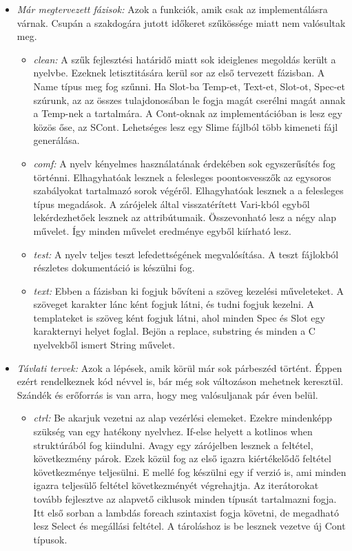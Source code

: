 {\begin{itemize}
\item \emph{Már megtervezett fázisok:}
Azok a funkciók, amik csak az implementálásra várnak.
Csupán a szakdogára jutott időkeret szűkössége miatt nem valósultak meg.
\begin{itemize}
\item \emph{clean:}
A szűk fejlesztési határidő miatt sok ideiglenes megoldás került a nyelvbe.
Ezeknek letisztitására kerül sor az első tervezett fázisban.
A Name típus meg fog szűnni.
Ha Slot-ba Temp-et, Text-et, Slot-ot, Spec-et szúrunk, az az összes tulajdonosában le fogja magát cserélni magát annak a Temp-nek a tartalmára.
A Cont-oknak az implementációban is lesz egy közös őse, az SCont.
Lehetséges lesz egy Slime fájlból több kimeneti fájl generálása.
\item \emph{comf:}
A nyelv kényelmes használatának érdekében sok egyszerűsítés fog történni.
Elhagyhatóak lesznek a felesleges poontosvesszők az egysoros szabályokat tartalmazó sorok végéről.
Elhagyhatóak lesznek a a felesleges típus megadások.
A zárójelek által visszatérített Vari-kból egyből lekérdezhetőek lesznek az attribútumaik. 
Összevonható lesz a négy alap művelet.
Így minden művelet eredménye egyből kiírható lesz.
\item \emph{test:}
A nyelv teljes teszt lefedettségének megvalósítása.
A teszt fájlokból részletes dokumentáció is készülni fog.
\item \emph{text:}
Ebben a fázisban ki fogjuk bővíteni a szöveg kezelési műveleteket.
A szöveget karakter lánc ként fogjuk látni, és tudni fogjuk kezelni.
A templateket is szöveg ként fogjuk látni, ahol minden Spec és Slot egy karakternyi helyet foglal.
Bejön a replace, substring és minden a C nyelvekből ismert String művelet.
\end{itemize}

\item \emph{Távlati tervek:}
Azok a lépések, amik körül már sok párbeszéd történt.
Éppen ezért rendelkeznek kód névvel is, bár még sok változáson mehetnek keresztül.
Szándék és erőforrás is van arra, hogy meg valósuljanak pár éven belül.

\begin{itemize}
\item \emph{ctrl:}
Be akarjuk vezetni az alap vezérlési elemeket.
Ezekre mindenképp szükség van egy hatékony nyelvhez.
If-else helyett a kotlinos when struktúrából fog kiindulni.
Avagy egy zárójelben lesznek a feltétel, következmény párok.
Ezek közül fog az első igazra kiértékelődő feltétel következménye teljesülni.
E mellé fog készülni egy if verzió is, ami minden igazra teljesülő feltétel következményét végrehajtja.
Az iterátorokat tovább fejlesztve az alapvető ciklusok minden típusát tartalmazni fogja.
Itt első sorban a lambdás foreach szintaxist fogja követni, de megadható lesz Select és megállási feltétel.
A tároláshoz is be lesznek vezetve új Cont típusok.


\end{itemize}
\end{itemize}}
